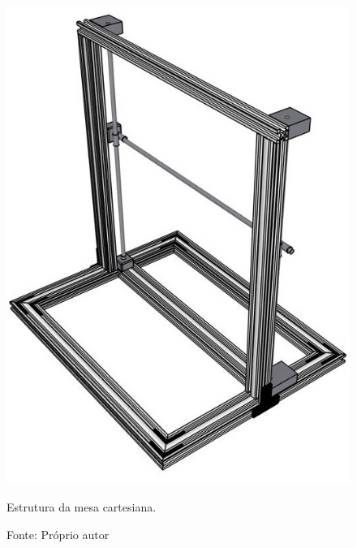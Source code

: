 \begin{figure}[H]
\centering
\includegraphics[scale = 1]{figuras/estruturamesa}
\caption{Estrutura da mesa cartesiana.}
\caption*{Fonte: Próprio autor}
\label{fig:estruturamesa}
\end{figure}

